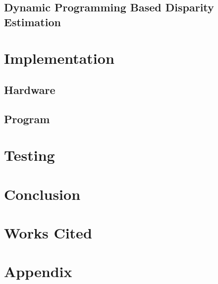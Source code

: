 \documentclass[11pt]{scrartcl}
\begin{document}
\subsection{Dynamic Programming Based Disparity Estimation}


\section{Implementation}

\subsection{Hardware}
\subsection{Program}

\section{Testing}

\section{Conclusion}

\section{Works Cited}

\section{Appendix}
\end{document}
